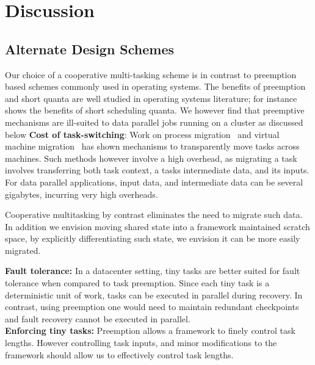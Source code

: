 \section{Discussion}

\subsection{Alternate Design Schemes}
\label{sec:alternate}
Our choice of a cooperative multi-tasking scheme is in contrast to
preemption based schemes commonly used in operating systems. The benefits of 
preemption and short quanta are well studied in operating
systems literature; for instance~\cite{sherman1972trace} shows the benefits
of short scheduling quanta. We however find that preemptive mechanisms are
ill-suited to data parallel jobs running on a cluster as discussed below
\textbf{Cost of task-switching}: Work on process
migration~\cite{douglis1991transparent,milojivcic2000process} and virtual
machine migration~\cite{clark2005live} has shown mechanisms to transparently
move tasks across machines. Such methods however involve a high overhead, as
migrating a task involves transferring both task context, a tasks intermediate
data, and its inputs. For data parallel applications, input data, and intermediate
data can be several gigabytes, incurring very high overheads.

Cooperative multitasking by contrast eliminates the need to migrate such data. In
addition we envision moving shared state into a framework maintained scratch space,
by explicitly differentiating such state, we envision it can be more easily migrated.

\textbf{Fault tolerance:} In a datacenter setting, tiny tasks are better suited for
fault tolerance when compared to task preemption. Since each tiny task is a
deterministic unit of work, tasks can be executed in parallel during recovery.
In contrast, using preemption one would need to maintain redundant checkpoints
and fault recovery cannot be executed in parallel. \\

\textbf{Enforcing tiny tasks:} Preemption allows a framework to finely control
task lengths. However controlling task inputs, and minor modifications to the 
framework should allow us to effectively control task lengths.\\

